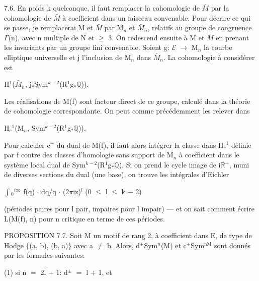\documentclass[10pt,twoside]{article}
\begin{document}
7.6. En poids k quelconque, il faut remplacer la cohomologie de \ensuremath{\bar{M}} par la cohomologie de \ensuremath{\bar{M}} à coefficient dans un faisceau convenable. Pour décrire ce qui se passe, je remplacerai M et \ensuremath{\bar{M}} par M\ensuremath{_{n}} et \ensuremath{\bar{M}}\ensuremath{_{n}}, relatifs au groupe de congruence \ensuremath{Γ}(n), avec n multiple de N et \ensuremath{≥} 3. On redescend ensuite à M et \ensuremath{\bar{M}} en prenant les invariants par un groupe fini convenable. Soient g: \ensuremath{ℰ} \ensuremath{→} M\ensuremath{_{n}} la courbe elliptique universelle et j l’inclusion de M\ensuremath{_{n}} dans \ensuremath{\bar{M}}\ensuremath{_{n}}. La cohomologie à considérer est\par
H\ensuremath{^{1}}(\ensuremath{\bar{M}}\ensuremath{_{n}}, j\ensuremath{_{*}}Sym\ensuremath{^{k−2}}(R\ensuremath{^{1}}g\ensuremath{_{*}}\ensuremath{ℚ})).\par
Les réalisations de M(f) sont facteur direct de ce groupe, calculé dans la théorie de cohomologie correspondante. On peut comme précédemment les relever dans\par
H\ensuremath{_{c}}\ensuremath{^{1}}(M\ensuremath{_{n}}, Sym\ensuremath{^{k−2}}(R\ensuremath{^{1}}g\ensuremath{_{*}}\ensuremath{ℚ})).\par
Pour calculer c\ensuremath{^{±}} du dual de M(f), il faut alors intégrer la classe dans H\ensuremath{_{c}}\ensuremath{^{1}} définie par f contre des classes d’homologie sans support de M\ensuremath{_{n}} à coefficient dans le système local dual de Sym\ensuremath{^{k−2}}(R\ensuremath{^{1}}g\ensuremath{_{*}}\ensuremath{ℚ}). Si on prend le cycle image de i\ensuremath{ℝ}\ensuremath{^{+}}, muni de diverses sections du dual (une base), on trouve les intégrales d’Eichler\par
\ensuremath{∫}\ensuremath{_{0}}\ensuremath{^{i∞}} f(q) \ensuremath{·} dq/q \ensuremath{·} (2\ensuremath{π}iz)\ensuremath{^{l}}    (0 \ensuremath{≤} l \ensuremath{≤} k \ensuremath{−} 2)\par
(périodes paires pour l pair, impaires pour l impair) — et on sait comment écrire L(M(f), n) pour n critique en terme de ces périodes.\par
PROPOSITION 7.7. Soit M un motif de rang 2, à coefficient dans E, de type de Hodge \{(a, b), (b, a)\} avec a \ensuremath{≠} b. Alors, d\ensuremath{^{±}}Sym\ensuremath{^{n}}(M) et c\ensuremath{^{±}}Sym\ensuremath{^{\mathrm{nM}}} sont donnés par les formules suivantes:\par
(1) si n \ensuremath{=} 2l \ensuremath{+} 1: d\ensuremath{^{±}} \ensuremath{=} l \ensuremath{+} 1, et\par
\end{document}
